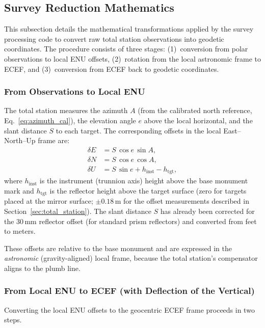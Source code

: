 \subsection{Survey Reduction Mathematics}
\label{sec:survey_math}

This subsection details the mathematical transformations applied by the survey processing code to convert raw total station observations into geodetic coordinates. The procedure consists of three stages: (1)~conversion from polar observations to local ENU offsets, (2)~rotation from the local astronomic frame to ECEF, and (3)~conversion from ECEF back to geodetic coordinates.

\subsubsection{From Observations to Local ENU}

The total station measures the azimuth $A$ (from the calibrated north reference, Eq.~\ref{eq:azimuth_cal}), the elevation angle $e$ above the local horizontal, and the slant distance $S$ to each target. The corresponding offsets in the local East--North--Up frame are:
\begin{align}
\delta E &= S\,\cos e\,\sin A, \label{eq:obs2enu_E}\\
\delta N &= S\,\cos e\,\cos A, \label{eq:obs2enu_N}\\
\delta U &= S\,\sin e + h_{\text{inst}} - h_{\text{tgt}}, \label{eq:obs2enu_U}
\end{align}
where $h_{\text{inst}}$ is the instrument (trunnion axis) height above the base monument mark and $h_{\text{tgt}}$ is the reflector height above the target surface (zero for targets placed at the mirror surface; $\pm 0.18$\,m for the offset measurements described in Section~\ref{sec:total_station}). The slant distance $S$ has already been corrected for the 30\,mm reflector offset (for standard prism reflectors) and converted from feet to meters.

These offsets are relative to the base monument and are expressed in the \emph{astronomic} (gravity-aligned) local frame, because the total station's compensator aligns to the plumb line.

\subsubsection{From Local ENU to ECEF (with Deflection of the Vertical)}

Converting the local ENU offsets to the geocentric ECEF frame proceeds in two steps.

